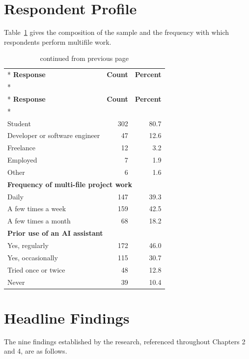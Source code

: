 \documentclass{FastFyp}
\begin{document}
\section{Respondent Profile}
Table~\ref{tab:appprofile} gives the composition of the sample and the frequency with which respondents perform multifile work.

{
\begin{longtable}{|p{6.0cm}|r|r|}
\caption{Respondent role and work frequency.}\label{tab:appprofile}\\*
\hline
\textbf{Response} & \textbf{Count} & \textbf{Percent} \\*
\hline
\endfirsthead
\caption[]{continued from previous page}\\*
\hline
\textbf{Response} & \textbf{Count} & \textbf{Percent} \\*
\hline
\endhead
\hline
\multicolumn{3}{|l|}{\textbf{Role}} \\
\hline
Student & 302 & 80.7 \\
\hline
Developer or software engineer & 47 & 12.6 \\
\hline
Freelance & 12 & 3.2 \\
\hline
Employed & 7 & 1.9 \\
\hline
Other & 6 & 1.6 \\
\hline
\multicolumn{3}{|l|}{\textbf{Frequency of multi-file project work}} \\
\hline
Daily & 147 & 39.3 \\
\hline
A few times a week & 159 & 42.5 \\
\hline
A few times a month & 68 & 18.2 \\
\hline
\multicolumn{3}{|l|}{\textbf{Prior use of an AI assistant}} \\
\hline
Yes, regularly & 172 & 46.0 \\
\hline
Yes, occasionally & 115 & 30.7 \\
\hline
Tried once or twice & 48 & 12.8 \\
\hline
Never & 39 & 10.4 \\
\hline
\end{longtable}
}

\section{Headline Findings}
The nine findings established by the research, referenced throughout Chapters 2 and 4, are as follows.
\end{document}
